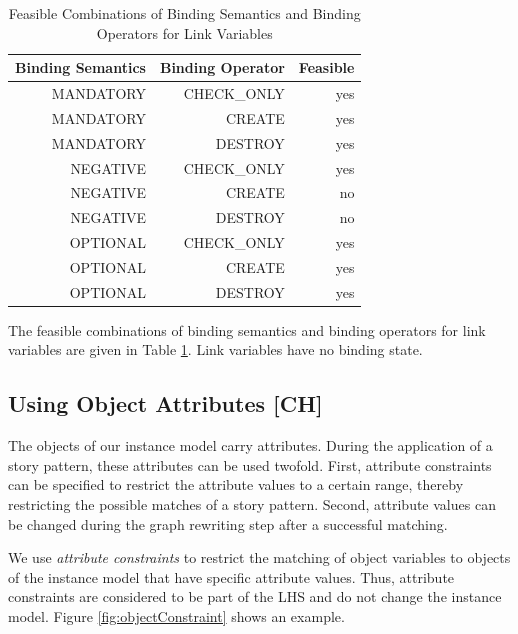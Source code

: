 

\begin{table}[htbp]
  \centering
  \caption{Feasible Combinations of Binding Semantics and
  Binding Operators for Link Variables}
    \begin{tabular}{|r|r|r|}
    \hline
    \textbf{Binding Semantics} & \textbf{Binding
    Operator} & \textbf{Feasible} \\
    \hline
    MANDATORY & CHECK\_ONLY & yes \\
    MANDATORY & CREATE & yes \\
    MANDATORY & DESTROY & yes \\
    NEGATIVE & CHECK\_ONLY & yes \\
    NEGATIVE & CREATE & no \\
    NEGATIVE & DESTROY & no \\
    OPTIONAL & CHECK\_ONLY & yes \\
    OPTIONAL & CREATE & yes \\
    OPTIONAL & DESTROY & yes \\
    \hline
    \end{tabular}%
  \label{tab:bindingCombinations_links}%
\end{table}%

The feasible combinations of binding semantics and binding operators for link
variables are given in Table \ref{tab:bindingCombinations_links}. Link variables
have no binding state.


\subsection{Using Object Attributes [CH]}
\label{sec:StoryPatterns:attributes}

The objects of our instance model carry attributes. 
During the application of a story pattern, these attributes can be used twofold. 
First, attribute constraints can be specified to restrict the attribute values to a certain range, thereby restricting the possible matches of a story pattern. 
Second, attribute values can be changed during the graph rewriting step after a successful matching.

We use \emph{attribute constraints} to restrict the matching of object variables to objects of the instance model that have specific attribute values. 
Thus, attribute constraints are considered to be part of the LHS and do not change the instance model. 
Figure \ref{fig:objectConstraint} shows an example.

